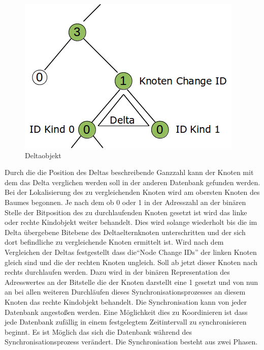\documentclass[a4paper,11pt,oneside,%
headsepline,												%
footsepline,												%
bibtotocnumbered									%
]{scrreprt}
\begin{document}
\begin{figure}
  \begin{center}
    \includegraphics[width=.8\linewidth]{bilder/SynchroDelta.png}
  \end{center}
 \caption{Deltaobjekt}
\end{figure}
Durch die die Position des Deltas beschreibende Ganzzahl kann der Knoten mit dem das Delta verglichen werden soll in der anderen Datenbank gefunden werden. Bei der Lokalisierung des zu vergleichenden Knoten wird am obersten Knoten des Baumes begonnen. Je nach dem ob 0 oder 1 in der Adresszahl an der binären Stelle der Bitposition des zu durchlaufenden Knoten gesetzt ist wird das linke oder rechte Kindobjekt weiter behandelt. Dies wird solange wiederholt bis die im Delta übergebene Bitebene des Deltaelternknoten unterschritten und der sich dort befindliche zu vergleichende Knoten ermittelt ist.
Wird nach dem Vergleichen der Deltas festgestellt dass die\enquote{Node Change IDs} der linken Knoten gleich sind und die der rechten Knoten ungleich. Soll ab jetzt dieser Knoten nach rechts durchlaufen werden. Dazu wird in der binären Representation des Adresswertes an der Bitstelle die der Knoten darstellt eine 1 gesetzt und von nun an bei allen weiteren Durchläufen dieses Synchronisationsprozesses an diesem Knoten das rechte Kindobjekt behandelt.
Die Synchronisation kann von jeder Datenbank angestoßen werden. Eine Möglichkeit dies zu Koordinieren ist dass jede Datenbank zufällig in einem festgelegtem Zeitintervall zu synchronisieren beginnt. Es ist Möglich das sich die Datenbank während des Synchronisationsprozess verändert. Die Synchronisation besteht aus zwei Phasen. 
\end{document}
